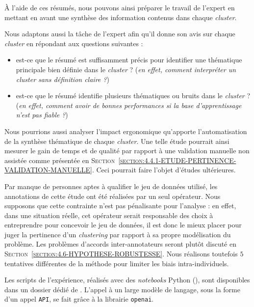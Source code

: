 			À l'aide de ces résumés, nous pouvons ainsi préparer le travail de l'expert en mettant en avant une synthèse des information contenus dans chaque \textit{cluster}.
			
			Nous adaptons aussi la tâche de l'expert afin qu'il donne son avis sur chaque \textit{cluster} en répondant aux questions suivantes :
			\begin{itemize}
				\item est-ce que le résumé est suffisamment précis pour identifier une thématique principale bien définie dans le \textit{cluster} ? (\textit{en effet, comment interpréter un cluster sans définition claire ?})
				\item est-ce que le résumé identifie plusieurs thématiques ou bruits dans le \textit{cluster} ? (\textit{en effet, comment avoir de bonnes performances si la base d'apprentissage n'est pas fiable ?})
			\end{itemize}
			
			\begin{leftBarIdea}
				Nous pourrions aussi analyser l'impact ergonomique qu'apporte l'automatisation de la synthèse thématique de chaque \textit{cluster}.
				Une telle étude pourrait ainsi mesurer le gain de temps et de qualité par rapport à une validation manuelle non assistée comme présentée en \textsc{Section~\ref{section:4.4.1-ETUDE-PERTINENCE-VALIDATION-MANUELLE}}.
				Ceci pourrait faire l'objet d'études ultérieures.
			\end{leftBarIdea}
			
			\begin{leftBarWarning}
				Par manque de personnes aptes à qualifier le jeu de données utilisé, les annotations de cette étude ont été réalisées par un seul opérateur.
				Nous supposons que cette contrainte n'est pas pénalisante pour l'analyse : en effet, dans une situation réelle, cet opérateur serait responsable des choix à entreprendre pour concevoir le jeu de données, il est donc le mieux placer pour juger la pertinence d'un \textit{clustering} par rapport à sa propre modélisation du problème.
				Les problèmes d'accords inter-annotateurs seront plutôt discuté en \textsc{Section~\ref{section:4.6-HYPOTHESE-ROBUSTESSE}}.
				Nous réalisons toutefois $5$ tentatives différentes de la méthode pour limiter les biais intra-individuels.
			\end{leftBarWarning}
			
			\begin{leftBarInformation}
				Les scripts de l'expérience, réalisés avec des \textit{notebooks} Python (\cite{van-rossum-drake:2009:python-reference-manual}), sont disponibles dans un dossier dédié de \cite{schild:2021:cognitivefactory-interactiveclusteringcomparativestudy}.
				L'appel à un large modèle de langage, sous la forme d'un appel \texttt{API}, se fait grâce à la librairie \texttt{openai}.
			\end{leftBarInformation}

